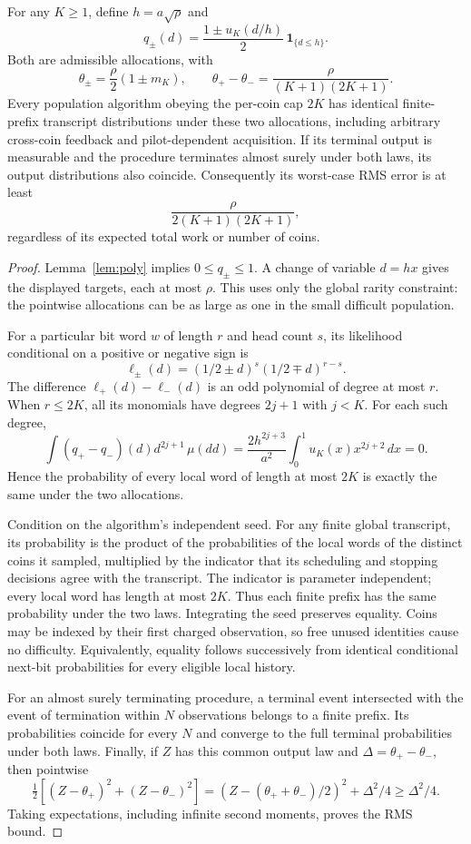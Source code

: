 \begin{theorem}
\label{thm:cap}
For any $K\ge1$, define $h=a\sqrt\rho$ and
\[
 q_\pm(d)=\frac{1\pm u_K(d/h)}2\,\mathbf1_{\{d\le h\}}.
\]
Both are admissible allocations, with
\[
 \theta_\pm=\frac\rho2(1\pm m_K),\qquad
 \theta_+-\theta_-=\frac\rho{(K+1)(2K+1)}.
\]
Every population algorithm obeying the per-coin cap $2K$ has identical
finite-prefix transcript distributions under these two allocations,
including arbitrary cross-coin feedback and pilot-dependent acquisition.
If its terminal output is measurable and the procedure terminates almost
surely under both laws, its output distributions also coincide. Consequently
its worst-case RMS error is at least
\[
 \frac\rho{2(K+1)(2K+1)},
\]
regardless of its expected total work or number of coins.
\end{theorem}
\begin{proof}
Lemma~\ref{lem:poly} implies $0\le q_\pm\le1$. A change of variable
$d=hx$ gives the displayed targets, each at most $\rho$. This uses only
the global rarity constraint: the pointwise allocations can be as large as
one in the small difficult population.

For a particular bit word $w$ of length $r$ and head count $s$, its likelihood
conditional on a positive or negative sign is
\[
 \ell_\pm(d)=(1/2\pm d)^s(1/2\mp d)^{r-s}.
\]
The difference $\ell_+(d)-\ell_-(d)$ is an odd polynomial of degree at most
$r$. When $r\le2K$, all its monomials have degrees $2j+1$ with $j<K$.
For each such degree,
\[
 \int(q_+-q_-)(d)d^{2j+1}\,\mu(dd)
 =\frac{2h^{2j+3}}{a^2}\int_0^1u_K(x)x^{2j+2}\,dx=0.
\]
Hence the probability of every local word of length at most $2K$ is exactly
the same under the two allocations.

Condition on the algorithm's independent seed. For any finite global
transcript, its probability is the product of the probabilities of the
local words of the distinct coins it sampled, multiplied by the indicator
that its scheduling and stopping decisions agree with the transcript.
The indicator is parameter independent; every local word has length at most
$2K$. Thus each finite prefix has the same probability under the two laws.
Integrating the seed preserves equality. Coins may be indexed by their
first charged observation, so free unused identities cause no difficulty.
Equivalently, equality follows successively from identical conditional
next-bit probabilities for every eligible local history.

For an almost surely terminating procedure, a terminal event intersected
with the event of termination within $N$ observations belongs to a finite
prefix. Its probabilities coincide for every $N$ and converge to the full
terminal probabilities under both laws. Finally, if $Z$ has this common
output law and $\Delta=\theta_+-\theta_-$, then pointwise
\[
 \tfrac12[(Z-\theta_+)^2+(Z-\theta_-)^2]
 =(Z-(\theta_++\theta_-)/2)^2+\Delta^2/4\ge\Delta^2/4.
\]
Taking expectations, including infinite second moments, proves the RMS bound.
\end{proof}

